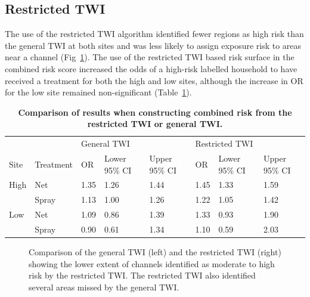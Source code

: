 \documentclass[10pt,letterpaper]{article}\usepackage[]{graphicx}\usepackage[]{color}
\begin{document}
\subsection{Restricted TWI}

The use of the restricted TWI algorithm identified fewer regions as high risk than the general TWI at both sites and was less likely to assign exposure risk to areas near a channel (Fig~\ref{twis}).  The use of the restricted TWI based risk surface in the combined risk score increased the odds of a high-risk labelled household to have received a treatment for both the high and low sites,  although the increase in OR for the low site remained non-significant (Table~\ref{Sens}).

  


\begin{table}[!ht]
\begin{adjustwidth}{-2.25in}{0in} %
\centering
\caption{
{\bf Comparison of results when constructing combined risk from the restricted TWI or general TWI.} 
}
\begin{tabular}{llllllll}
  \hline
 &  & \multicolumn{3}{l}{General TWI} & \multicolumn{3}{l}{Restricted TWI}\\
Site & Treatment & OR & Lower 95\% CI & Upper 95\% CI & OR & Lower 95\% CI & Upper 95\% CI \\ 
  \hline
High & Net & 1.35 & 1.26 & 1.44 & 1.45 & 1.33 & 1.59 \\ 
   & Spray & 1.13 & 1.00 & 1.26 & 1.22 & 1.05 & 1.42 \\ 
  Low & Net & 1.09 & 0.86 & 1.39 & 1.33 & 0.93 & 1.90 \\ 
   & Spray & 0.90 & 0.61 & 1.34 & 1.10 & 0.59 & 2.03 \\ 
   \hline
\end{tabular}
\label{Sens}
\end{adjustwidth}
\end{table}

\begin{figure}[!h]
\centering
\caption{Comparison of the general TWI (left) and the restricted TWI (right) showing the lower extent of channels identified as moderate to high risk by the restricted TWI.  The restricted TWI also identified several areas missed by the general TWI. }
\label{twis}
\end{figure}



\end{document}
